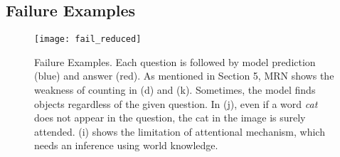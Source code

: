 \documentclass{article}
\begin{document}
\newpage
\subsection{Failure Examples}

\begin{figure}[ht!]
\centering
\texttt{[image: fail\_reduced]}
\caption{Failure Examples. Each question is followed by model prediction (blue) and answer (red). As mentioned in Section 5, MRN shows the weakness of counting in (d) and (k). Sometimes, the model finds objects regardless of the given question. In (j), even if a word \textit{cat} does not appear in the question, the cat in the image is surely attended. (i) shows the limitation of attentional mechanism, which needs an inference using world knowledge.}
\label{fig:more}
\end{figure}

\clearpage{}
\end{document}
